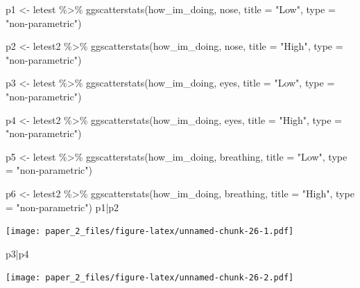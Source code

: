 \documentclass[
]{article}
\newenvironment{Shaded}{\begin{snugshade}}{\end{snugshade}}
\newcommand{\AttributeTok}[1]{\textcolor[rgb]{0.77,0.63,0.00}{#1}}
\newcommand{\FunctionTok}[1]{\textcolor[rgb]{0.00,0.00,0.00}{#1}}
\newcommand{\NormalTok}[1]{#1}
\newcommand{\OtherTok}[1]{\textcolor[rgb]{0.56,0.35,0.01}{#1}}
\newcommand{\SpecialCharTok}[1]{\textcolor[rgb]{0.00,0.00,0.00}{#1}}
\newcommand{\StringTok}[1]{\textcolor[rgb]{0.31,0.60,0.02}{#1}}
\begin{document}
\begin{Shaded}
\begin{Highlighting}[]
\NormalTok{p1 }\OtherTok{\textless{}{-}}\NormalTok{ letest }\SpecialCharTok{\%\textgreater{}\%}
  \FunctionTok{ggscatterstats}\NormalTok{(how\_im\_doing, nose, }\AttributeTok{title =} \StringTok{"Low"}\NormalTok{, }\AttributeTok{type =} \StringTok{"non{-}parametric"}\NormalTok{)}


\NormalTok{p2 }\OtherTok{\textless{}{-}}\NormalTok{ letest2 }\SpecialCharTok{\%\textgreater{}\%}
  \FunctionTok{ggscatterstats}\NormalTok{(how\_im\_doing, nose, }\AttributeTok{title =} \StringTok{"High"}\NormalTok{, }\AttributeTok{type =} \StringTok{"non{-}parametric"}\NormalTok{)}

\NormalTok{p3 }\OtherTok{\textless{}{-}}\NormalTok{ letest }\SpecialCharTok{\%\textgreater{}\%}
  \FunctionTok{ggscatterstats}\NormalTok{(how\_im\_doing, eyes, }\AttributeTok{title =} \StringTok{"Low"}\NormalTok{, }\AttributeTok{type =} \StringTok{"non{-}parametric"}\NormalTok{)}


\NormalTok{p4 }\OtherTok{\textless{}{-}}\NormalTok{ letest2 }\SpecialCharTok{\%\textgreater{}\%}
  \FunctionTok{ggscatterstats}\NormalTok{(how\_im\_doing, eyes, }\AttributeTok{title =} \StringTok{"High"}\NormalTok{, }\AttributeTok{type =} \StringTok{"non{-}parametric"}\NormalTok{)}

\NormalTok{p5 }\OtherTok{\textless{}{-}}\NormalTok{ letest }\SpecialCharTok{\%\textgreater{}\%}
  \FunctionTok{ggscatterstats}\NormalTok{(how\_im\_doing, breathing, }\AttributeTok{title =} \StringTok{"Low"}\NormalTok{, }\AttributeTok{type =} \StringTok{"non{-}parametric"}\NormalTok{)}


\NormalTok{p6 }\OtherTok{\textless{}{-}}\NormalTok{ letest2 }\SpecialCharTok{\%\textgreater{}\%}
  \FunctionTok{ggscatterstats}\NormalTok{(how\_im\_doing, breathing, }\AttributeTok{title =} \StringTok{"High"}\NormalTok{, }\AttributeTok{type =} \StringTok{"non{-}parametric"}\NormalTok{)}
\NormalTok{p1}\SpecialCharTok{|}\NormalTok{p2}
\end{Highlighting}
\end{Shaded}

\texttt{[image: paper\_2\_files/figure-latex/unnamed-chunk-26-1.pdf]}

\begin{Shaded}
\begin{Highlighting}[]
\NormalTok{p3}\SpecialCharTok{|}\NormalTok{p4}
\end{Highlighting}
\end{Shaded}

\texttt{[image: paper\_2\_files/figure-latex/unnamed-chunk-26-2.pdf]}
\end{document}
